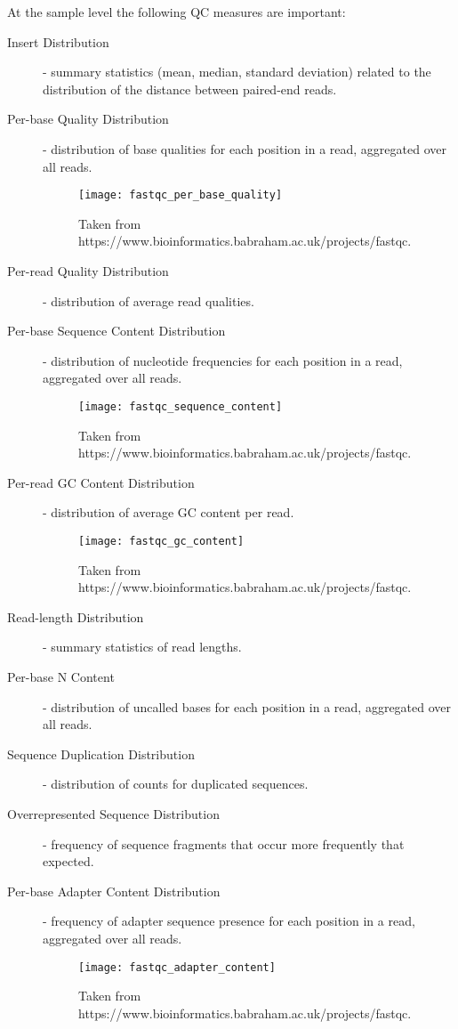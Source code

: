 At the sample level the following QC measures are important:

\begin{description}
    \item [Insert Distribution] - summary statistics (mean, median, standard deviation) related to the distribution of the distance between paired-end reads.
    \item [Per-base Quality Distribution] - distribution of base qualities for each position in a read, aggregated over all reads.
    \begin{figure}[H]
        \texttt{[image: fastqc\_per\_base\_quality]}
        \centering
        \caption {Taken from https://www.bioinformatics.babraham.ac.uk/projects/fastqc.}
        \label{fig:fastqc_per_base_quality}
    \end{figure} 
    \item [Per-read Quality Distribution] - distribution of average read qualities.
    \item [Per-base Sequence Content Distribution] - distribution of nucleotide frequencies for each position in a read, aggregated over all reads.
    \begin{figure}[H]
        \texttt{[image: fastqc\_sequence\_content]}
        \centering
        \caption {Taken from https://www.bioinformatics.babraham.ac.uk/projects/fastqc.}
        \label{fig:fastqc_sequence_content}
    \end{figure} 
    \item [Per-read GC Content Distribution] - distribution of average GC content per read.
    \begin{figure}[H]
        \texttt{[image: fastqc\_gc\_content]}
        \centering
        \caption {Taken from https://www.bioinformatics.babraham.ac.uk/projects/fastqc.}
        \label{fig:fastqc_gc_content}
    \end{figure}
    
    \item [Read-length Distribution] - summary statistics of read lengths.
    \item [Per-base N Content] - distribution of uncalled bases for each position in a read, aggregated over all reads.
    \item [Sequence Duplication Distribution] - distribution of counts for duplicated sequences.
    \item [Overrepresented Sequence Distribution] - frequency of sequence fragments that occur more frequently that expected.
    \item [Per-base Adapter Content Distribution] - frequency of adapter sequence presence for each position in a read, aggregated over all reads.
    \begin{figure}[H]
        \texttt{[image: fastqc\_adapter\_content]}
        \centering
        \caption {Taken from https://www.bioinformatics.babraham.ac.uk/projects/fastqc.}
        \label{fig:fastqc_adapter_content}
    \end{figure} 
    
\end{description}


